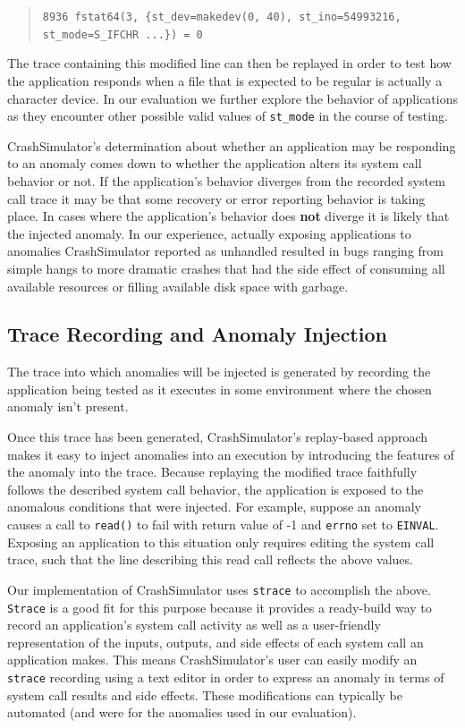 \begin{quote}
  {\tt 8936  fstat64(3, \{st\_dev=makedev(0, 40), st\_ino=54993216, st\_mode=S\_IFCHR ...\}) = 0}
\end{quote}

The trace containing this modified line can then be replayed in order to
test how the application responds when a file that is expected to be
regular is actually a character device. In our evaluation we further
explore the behavior of applications as they encounter other possible valid
values of {\tt st\_mode} in the course of testing.

CrashSimulator's determination about whether an application may be
responding to an anomaly comes down to whether the application alters its
system call behavior or not.  If the application's behavior diverges from
the recorded system call trace it may be that some recovery or error
reporting behavior is taking place.  In cases where the application's
behavior does \textbf{not} diverge it is likely that the injected anomaly.
In our experience, actually exposing applications to anomalies
CrashSimulator reported as unhandled resulted in bugs ranging from simple
hangs to more dramatic crashes that had the side effect of consuming all
available resources or filling available disk space with garbage.

\subsection{Trace Recording and Anomaly Injection}

The trace into which anomalies will be injected is generated by recording
the application being tested as it executes in some environment where the
chosen anomaly isn't present.

Once this trace has been generated, CrashSimulator's replay-based approach
makes it easy to inject anomalies into an execution by introducing the
features of the anomaly into the trace.  Because replaying the modified
trace faithfully follows the described system call behavior, the
application is exposed to the anomalous conditions that were injected.  For
example, suppose an anomaly causes a call to {\tt read()} to fail with
return value of -1 and {\tt errno} set to {\tt EINVAL}.  Exposing an
application to this situation only requires editing the system call trace,
such that the line describing this read call reflects the above values.

Our implementation of CrashSimulator uses {\tt strace} to accomplish the
above.  {\tt Strace} is a good fit for this purpose because it provides a
ready-build way to record an application's system call activity as well as
a user-friendly representation of the inputs, outputs, and side effects of
each system call an application makes.  This means CrashSimulator's user
can easily modify an {\tt strace} recording using a text editor in order to
express an anomaly in terms of system call results and side effects.  These
modifications can typically be automated (and were for the anomalies used
in our evaluation).


